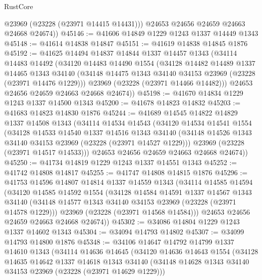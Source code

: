 \begin{lexlean}{RustCore}
\begin{coremodule}
          @23969
          (@23228 (@23971 @14415 @14431)))
        @24653
        @24656
        @24659
        @24663
        @24668
        @24674))
@45146 := @41606 @14849 @1229 @1243 @1337 @14449 @1343
@45148 := @41614 @14838 @14847
@45151 := @41619 @14838 @14845 @1876
@45192 := @41625
    @14494
    @14837
    @14844
    @1337
    @14457
    @1343
    (@34114
      @14483
      @14492
      (@34120
        @14483
        @14490
        @1554
        (@34128
          @14482
          @14489
          @1337
          @14465
          @1343
          @34140
          (@34148 @14475 @1343 @34140 @34153 @23969 (@23228 (@23971 @14476 @1229)))
          @23969
          (@23228 (@23971 @14466 @14482)))
        @24653
        @24656
        @24659
        @24663
        @24668
        @24674))
@45198 := @41670 @14834 @1229 @1243 @1337 @14500 @1343
@45200 := @41678 @14823 @14832
@45203 := @41683 @14823 @14830 @1876
@45244 := @41689
    @14545
    @14822
    @14829
    @1337
    @14508
    @1343
    (@34114
      @14534
      @14543
      (@34120
        @14534
        @14541
        @1554
        (@34128
          @14533
          @14540
          @1337
          @14516
          @1343
          @34140
          (@34148 @14526 @1343 @34140 @34153 @23969 (@23228 (@23971 @14527 @1229)))
          @23969
          (@23228 (@23971 @14517 @14533)))
        @24653
        @24656
        @24659
        @24663
        @24668
        @24674))
@45250 := @41734 @14819 @1229 @1243 @1337 @14551 @1343
@45252 := @41742 @14808 @14817
@45255 := @41747 @14808 @14815 @1876
@45296 := @41753
    @14596
    @14807
    @14814
    @1337
    @14559
    @1343
    (@34114
      @14585
      @14594
      (@34120
        @14585
        @14592
        @1554
        (@34128
          @14584
          @14591
          @1337
          @14567
          @1343
          @34140
          (@34148 @14577 @1343 @34140 @34153 @23969 (@23228 (@23971 @14578 @1229)))
          @23969
          (@23228 (@23971 @14568 @14584)))
        @24653
        @24656
        @24659
        @24663
        @24668
        @24674))
@45302 := @34086 @14804 @1229 @1243 @1337 @14602 @1343
@45304 := @34094 @14793 @14802
@45307 := @34099 @14793 @14800 @1876
@45348 := @34106
    @14647
    @14792
    @14799
    @1337
    @14610
    @1343
    (@34114
      @14636
      @14645
      (@34120
        @14636
        @14643
        @1554
        (@34128
          @14635
          @14642
          @1337
          @14618
          @1343
          @34140
          (@34148 @14628 @1343 @34140 @34153 @23969 (@23228 (@23971 @14629 @1229)))

\end{coremodule}
\end{lexlean}
